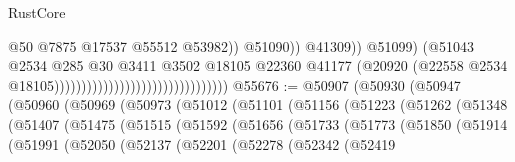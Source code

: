 \begin{lexlean}{RustCore}
\begin{coremodule}
                                                                            @50
                                                                            @7875
                                                                            @17537
                                                                            @55512
                                                                            @53982))
                                                                        @51090))
                                                                    @41309))
                                                                @51099)
                                                              (@51043
                                                                @2534
                                                                @285
                                                                @30
                                                                @3411
                                                                @3502
                                                                @18105
                                                                @22360
                                                                @41177
                                                                (@20920
                                                                  (@22558
                                                                    @2534
                                                                    @18105))))))))))))))))))))))))))))))))
@55676 := @50907
    (@50930
      (@50947
        (@50960
          (@50969
            (@50973
              (@51012
                (@51101
                  (@51156
                    (@51223
                      (@51262
                        (@51348
                          (@51407
                            (@51475
                              (@51515
                                (@51592
                                  (@51656
                                    (@51733
                                      (@51773
                                        (@51850
                                          (@51914
                                            (@51991
                                              (@52050
                                                (@52137
                                                  (@52201
                                                    (@52278
                                                      (@52342
                                                        (@52419

\end{coremodule}
\end{lexlean}
